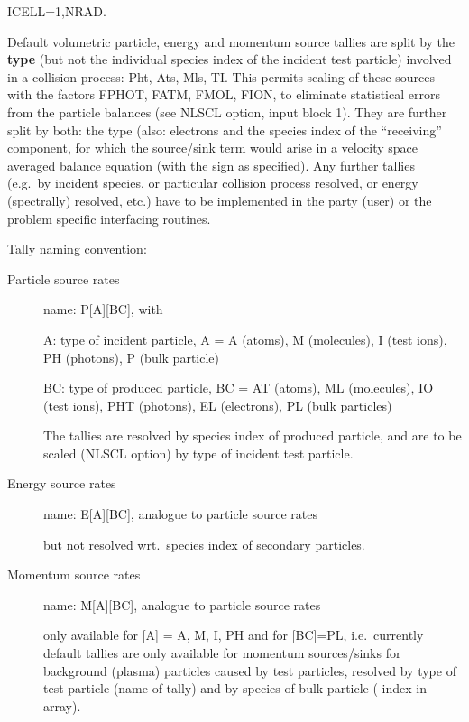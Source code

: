 ICELL=1,NRAD.
%

Default volumetric particle, energy and momentum source tallies are split by
the \textbf{type} (but not the individual species index of the incident test
particle) involved in a collision process: \ac{Pht}, \ac{Ats}, \ac{Mls},
\ac{TI}.
This permits scaling of these sources with the factors FPHOT, FATM, FMOL, FION,
to eliminate statistical errors from the particle balances (see NLSCL option,
input block 1).
They are further split by both:
the type (also: electrons and the species index of the ``receiving''
component, for which the source/sink term would arise in a velocity
space averaged balance equation (with the sign as specified).
Any further tallies (e.g.\ by incident species, or particular collision process
resolved, or energy (spectrally) resolved, etc.) have to be implemented in the
 party (user) or the problem specific interfacing routines.

Tally naming convention:
\begin{description}
  \item[Particle source rates] 

        name: P[A][BC], with 

        A: type of incident particle, A = A (atoms), M (molecules), I (test ions),
        PH (photons), P (bulk particle) 

        BC: type of produced particle, BC = AT (atoms), ML (molecules), IO (test ions),
        PHT (photons), EL (electrons), PL (bulk particles) 

        The tallies are resolved by species index of produced particle, and are to be
        scaled (NLSCL option) by type of incident test particle.
  \item[Energy source rates] 

        name: E[A][BC], analogue to particle source rates 

        but not resolved wrt.\ species index of secondary particles.
  \item[Momentum source rates] 

        name: M[A][BC], analogue to particle source rates 

        only available for [A] = A, M, I, PH  and for [BC]=PL, i.e.\ currently default
        tallies are only available for momentum sources/sinks for background (plasma)
        particles caused by test particles, resolved by type of test particle (name of
        tally) and by species of bulk particle ( index in array).
\end{description}


